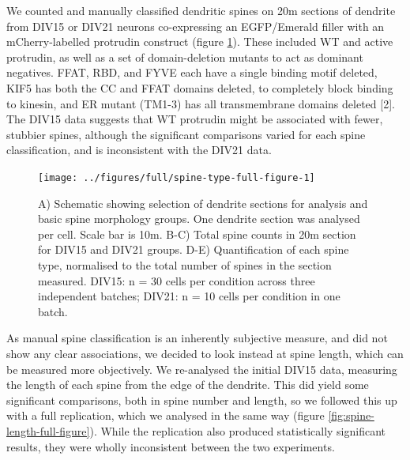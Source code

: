 \documentclass[
  12pt,
  a4paper,
]{book}
\begin{document}
We counted and manually classified dendritic spines on 20\textmu{}m sections of dendrite from DIV15 or DIV21 neurons co-expressing an EGFP/Emerald filler with an mCherry-labelled protrudin construct (figure \ref{fig:spine-type-full-figure}). These included WT and active protrudin, as well as a set of domain-deletion mutants to act as dominant negatives. \textDelta{}FFAT, \textDelta{}RBD, and \textDelta{}FYVE each have a single binding motif deleted, \textDelta{}KIF5 has both the CC and FFAT domains deleted, to completely block binding to kinesin, and \textDelta{}ER mutant (\textDelta{}TM1-3) has all transmembrane domains deleted {[}2{]}. The DIV15 data suggests that WT protrudin might be associated with fewer, stubbier spines, although the significant comparisons varied for each spine classification, and is inconsistent with the DIV21 data.


\begin{figure}
\texttt{[image: ../figures/full/spine-type-full-figure-1]} \caption[Protrudin effect on dendritic spine morphology]{A) Schematic showing selection of dendrite sections for analysis and basic spine morphology groups.  One dendrite section was analysed per cell.  Scale bar is 10\textmu{}m.  B-C) Total spine counts in 20\textmu{}m section for DIV15 and DIV21 groups.  D-E) Quantification of each spine type, normalised to the total number of spines in the section measured.  DIV15: n = 30 cells per condition across three independent batches; DIV21: n = 10 cells per condition in one batch.}\label{fig:spine-type-full-figure}
\end{figure}

\restoregeometry
{} %

As manual spine classification is an inherently subjective measure, and did not show any clear associations, we decided to look instead at spine length, which can be measured more objectively. We re-analysed the initial DIV15 data, measuring the length of each spine from the edge of the dendrite. This did yield some significant comparisons, both in spine number and length, so we followed this up with a full replication, which we analysed in the same way (figure \ref{fig:spine-length-full-figure}). While the replication also produced statistically significant results, they were wholly inconsistent between the two experiments.
\end{document}
